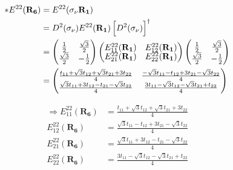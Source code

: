 \documentclass{report}
\begin{document}
\begin{align*}
	\ast E^{22}(\mathbf{R_6}) & = E^{22}(\sigma_\nu\mathbf{ R_1})                                                                                               \\
	                          & = D^2(\sigma_\nu)  E^{22}(\mathbf{R_1}) \left[ D^2(\sigma_\nu) \right]^\dagger                                                  \\
	                          &
	=
	\begin{pmatrix}
		\renewcommand{\arraystretch}{0.72}
		\frac{1}{2}        & \frac{\sqrt{3}}{2} \\
		\frac{\sqrt{3}}{2} & -\frac{1}{2}
	\end{pmatrix}
	\begin{pmatrix}
		E_{11}^{22}(\mathbf{R_1}) & E_{12}^{22}(\mathbf{R_1}) \\
		E_{21}^{22}(\mathbf{R_1}) & E_{22}^{22}(\mathbf{R_1})
	\end{pmatrix}
	\begin{pmatrix}
		\frac{1}{2}        & \frac{\sqrt{3}}{2} \\
		\frac{\sqrt{3}}{2} & -\frac{1}{2}
	\end{pmatrix}                                                                                                     \\
	                          & = \begin{pmatrix}
		                              \frac{t_{11} + \sqrt{3}t_{12} + \sqrt{3}t_{21} + 3t_{22}}{4} & \frac{-\sqrt{3}t_{11} - t_{12} + 3 t_{21} - \sqrt{3}t_{22}}{4} \\
		                              \frac{\sqrt{3}t_{11} + 3t_{12} - t_{21} - \sqrt{3}t_{22}}{4} & \frac{3t_{11} - \sqrt{3}t_{12} - \sqrt{3}t_{21} + t_{22}}{4}
	                              \end{pmatrix}
\end{align*}

\begin{align*}
	\Rightarrow E_{11}^{22}(\mathbf{R_6}) & =  \frac{t_{11} + \sqrt{3}t_{12} + \sqrt{3}t_{21} + 3t_{22}}{4} \\
	E_{12}^{22}(\mathbf{R_6})             & = \frac{\sqrt{3}t_{11} - t_{12} + 3 t_{21} - \sqrt{3}t_{22}}{4} \\
	E_{21}^{22}(\mathbf{R_6})             & = \frac{\sqrt{3}t_{11} + 3t_{12} - t_{21} - \sqrt{3}t_{22}}{4}  \\
	E_{22}^{22}(\mathbf{R_6})             & = \frac{3t_{11} - \sqrt{3}t_{12} - \sqrt{3}t_{21} + t_{22}}{4}  \\
\end{align*}
\end{document}
